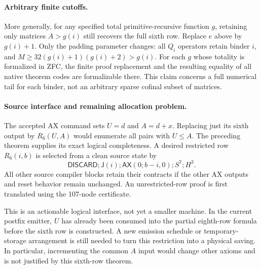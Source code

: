 \paragraph{Arbitrary finite cutoffs.}
More generally, for any specified total primitive-recursive function $g$,
retaining only matrices $A>g(i)$ still recovers the full sixth row.
Replace $e$ above by $g(i)+1$. Only the padding parameter changes:
all $Q_i$ operators retain binder $i$, and
$M\ge32(g(i)+1)(g(i)+2)>g(i)$. For each $g$ whose totality is formalized
in ZFC, the finite proof replacement and the resulting equality of
all native theorem codes are formalizable there. This claim concerns a
full numerical tail for each binder, not an arbitrary sparse cofinal
subset of matrices.

\paragraph{Source interface and remaining allocation problem.}
The accepted AX command sets $U=d$ and $A=d+x$. Replacing just its
sixth output by $R_6(U,A)$ would enumerate all pairs with $U\leq A$.
The preceding theorem supplies its exact logical completeness.
A desired restricted row $R_6(i,b)$ is selected from a clean source
state by
\[
 \mathsf{DISCARD};\mathsf J(i);
 \mathsf{AX}(0;b-i,0);
 S^{7};H^{3}.
\]
All other source compiler blocks retain their contracts if the other AX
outputs and reset behavior remain unchanged. An unrestricted-row proof
is first translated using the 107-node certificate.

This is an actionable logical interface, not yet a smaller machine.
In the current postfix emitter, $U$ has already been consumed into the
partial eighth-row formula before the sixth row is constructed. A new
emission schedule or temporary-storage arrangement is still needed to
turn this restriction into a physical saving. In particular, incrementing
the common $A$ input would change other axioms and is not justified by
this sixth-row theorem.
